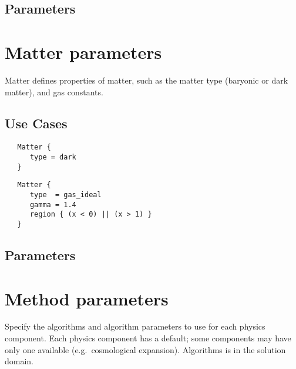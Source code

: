 \documentclass{book}
\begin{document}
\subsection{Parameters}

\section{Matter parameters} \label{s:matter}

 Matter defines properties of matter, such as the matter type (baryonic
 or dark matter), and gas constants.

\subsection{Use Cases}

\begin{verbatim}
   Matter {
      type = dark
   }
\end{verbatim}

\begin{verbatim}
   Matter {
      type  = gas_ideal
      gamma = 1.4
      region { (x < 0) || (x > 1) }
   }
\end{verbatim}
\subsection{Parameters}

\section{Method parameters} \label{s:method}

 Specify the algorithms and algorithm parameters
 to use for each physics component.  Each physics component has a
 default; some components may have only one available
 (e.g.~cosmological expansion).  Algorithms is in the solution domain.
\end{document}
